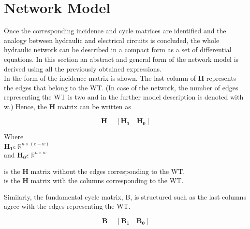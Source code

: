 \section{Network Model}  
\label{ParameterEstimation}
Once the corresponding incidence and cycle matrices are identified and the analogy between hydraulic and electrical circuits is concluded, the whole hydraulic network can be described in a compact form as a set of differential equations. In this section an abstract and general form of the network model is derived using all the previously obtained expressions. 
\\
In  the form of the incidence matrix is shown. The last column of $\pmb{H}$ represents the edges that belong to the WT. (In case of the network, the number of edges representing the WT is two and in the further model description is denoted with w.) Hence, the $\pmb{H}$ matrix can be written as 

\begin {equation}
\pmb{H} = [\pmb{H_1} \quad \pmb{H_0}]
\label{Hmatrix}
\end{equation}

\begin{minipage}[t]{0.18\textwidth}
Where\\
\hspace*{8mm} $\pmb{H_1} \epsilon \: \mathbb{R}^{n \times (e-w)}$  \\
and \hspace*{0.4mm} $\pmb{H_0} \epsilon \: \mathbb{R}^{n \times w} $ 
\end{minipage}
\begin{minipage}[t]{0.70\textwidth}
\vspace*{2mm}
\hspace*{4mm} is the $\pmb{H}$ matrix without the edges corresponding to the WT,\\
\hspace*{4mm} is the $\pmb{H}$ matrix with the columns corresponding to the WT. 
\end{minipage}

Similarly, the fundamental cycle matrix, B, is structured such as the last columns agree with the edges representing the WT.

\begin{equation}
  \pmb{B} = [\pmb{B_1} \quad \pmb{B_0}]
\end{equation} 

